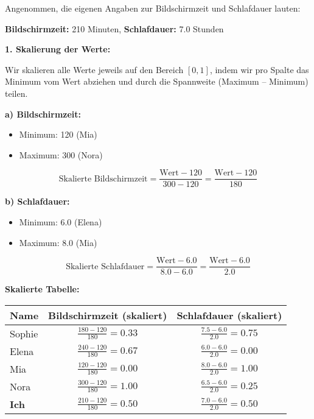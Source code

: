 \begin{aufgabe}{5}
Angenommen, die eigenen Angaben zur Bildschirmzeit und Schlafdauer lauten:
\begin{center}
\textbf{Bildschirmzeit:} 210 Minuten, \quad \textbf{Schlafdauer:} 7.0 Stunden
\end{center}

\vspace{1em}
\textbf{1. Skalierung der Werte:}

Wir skalieren alle Werte jeweils auf den Bereich $[0,1]$, indem wir pro Spalte das Minimum vom Wert abziehen und durch die Spannweite (Maximum – Minimum) teilen.

\vspace{1em}
\textbf{a) Bildschirmzeit:}

\begin{itemize}
  \item Minimum: 120 (Mia)
  \item Maximum: 300 (Nora)
\end{itemize}

\[
\text{Skalierte Bildschirmzeit} = \frac{\text{Wert} - 120}{300 - 120} = \frac{\text{Wert} - 120}{180}
\]

\textbf{b) Schlafdauer:}

\begin{itemize}
  \item Minimum: 6.0 (Elena)
  \item Maximum: 8.0 (Mia)
\end{itemize}

\[
\text{Skalierte Schlafdauer} = \frac{\text{Wert} - 6.0}{8.0 - 6.0} = \frac{\text{Wert} - 6.0}{2.0}
\]

\textbf{Skalierte Tabelle:}

\begin{center}
\begin{tabular}{|l|c|c|}
\hline
\textbf{Name} & \textbf{Bildschirmzeit (skaliert)} & \textbf{Schlafdauer (skaliert)} \\
\hline
Sophie & $\frac{180 - 120}{180} = 0.33$ & $\frac{7.5 - 6.0}{2.0} = 0.75$ \\
Elena  & $\frac{240 - 120}{180} = 0.67$ & $\frac{6.0 - 6.0}{2.0} = 0.00$ \\
Mia    & $\frac{120 - 120}{180} = 0.00$ & $\frac{8.0 - 6.0}{2.0} = 1.00$ \\
Nora   & $\frac{300 - 120}{180} = 1.00$ & $\frac{6.5 - 6.0}{2.0} = 0.25$ \\
\textbf{Ich}    & $\frac{210 - 120}{180} = 0.50$ & $\frac{7.0 - 6.0}{2.0} = 0.50$ \\
\hline
\end{tabular}
\end{center}


\end{aufgabe}
